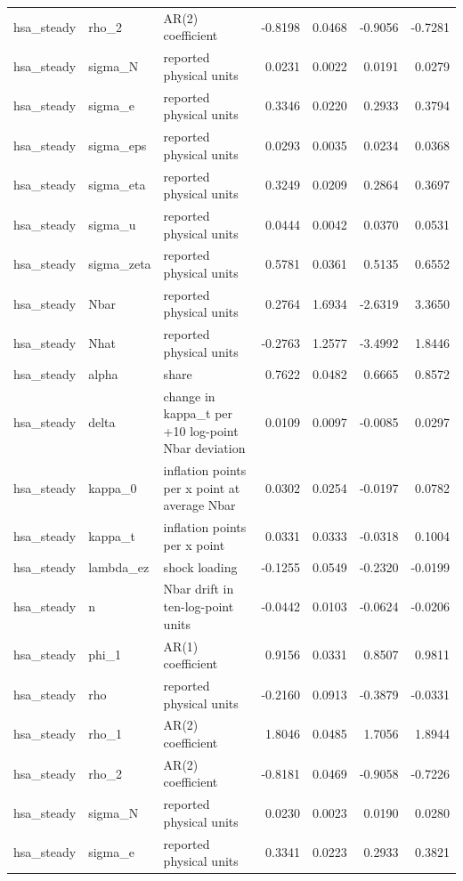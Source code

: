 \begin{tabular}{lllrrrr}
hsa\_steady & rho\_2 & AR(2) coefficient & -0.8198 & 0.0468 & -0.9056 & -0.7281 \\
hsa\_steady & sigma\_N & reported physical units & 0.0231 & 0.0022 & 0.0191 & 0.0279 \\
hsa\_steady & sigma\_e & reported physical units & 0.3346 & 0.0220 & 0.2933 & 0.3794 \\
hsa\_steady & sigma\_eps & reported physical units & 0.0293 & 0.0035 & 0.0234 & 0.0368 \\
hsa\_steady & sigma\_eta & reported physical units & 0.3249 & 0.0209 & 0.2864 & 0.3697 \\
hsa\_steady & sigma\_u & reported physical units & 0.0444 & 0.0042 & 0.0370 & 0.0531 \\
hsa\_steady & sigma\_zeta & reported physical units & 0.5781 & 0.0361 & 0.5135 & 0.6552 \\
hsa\_steady & Nbar & reported physical units & 0.2764 & 1.6934 & -2.6319 & 3.3650 \\
hsa\_steady & Nhat & reported physical units & -0.2763 & 1.2577 & -3.4992 & 1.8446 \\
hsa\_steady & alpha & share & 0.7622 & 0.0482 & 0.6665 & 0.8572 \\
hsa\_steady & delta & change in kappa\_t per +10 log-point Nbar deviation & 0.0109 & 0.0097 & -0.0085 & 0.0297 \\
hsa\_steady & kappa\_0 & inflation points per x point at average Nbar & 0.0302 & 0.0254 & -0.0197 & 0.0782 \\
hsa\_steady & kappa\_t & inflation points per x point & 0.0331 & 0.0333 & -0.0318 & 0.1004 \\
hsa\_steady & lambda\_ez & shock loading & -0.1255 & 0.0549 & -0.2320 & -0.0199 \\
hsa\_steady & n & Nbar drift in ten-log-point units & -0.0442 & 0.0103 & -0.0624 & -0.0206 \\
hsa\_steady & phi\_1 & AR(1) coefficient & 0.9156 & 0.0331 & 0.8507 & 0.9811 \\
hsa\_steady & rho & reported physical units & -0.2160 & 0.0913 & -0.3879 & -0.0331 \\
hsa\_steady & rho\_1 & AR(2) coefficient & 1.8046 & 0.0485 & 1.7056 & 1.8944 \\
hsa\_steady & rho\_2 & AR(2) coefficient & -0.8181 & 0.0469 & -0.9058 & -0.7226 \\
hsa\_steady & sigma\_N & reported physical units & 0.0230 & 0.0023 & 0.0190 & 0.0280 \\
hsa\_steady & sigma\_e & reported physical units & 0.3341 & 0.0223 & 0.2933 & 0.3821 \\

\end{tabular}

